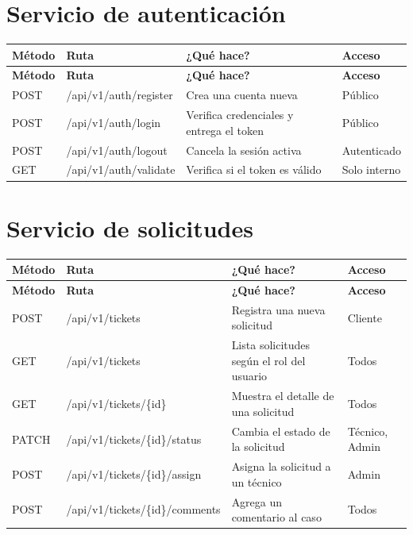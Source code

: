 \documentclass[12pt, a4paper]{report}
\begin{document}
\section{Servicio de autenticación}

\begin{longtable}{|p{1.8cm}|p{4.8cm}|p{4.2cm}|p{2.5cm}|}
\hline
\textbf{Método} & \textbf{Ruta} & \textbf{¿Qué hace?} &
\textbf{Acceso} \\
\hline
\endfirsthead
\hline
\textbf{Método} & \textbf{Ruta} & \textbf{¿Qué hace?} &
\textbf{Acceso} \\
\hline
\endhead
POST & /api/v1/auth/register &
Crea una cuenta nueva & Público \\
\hline
POST & /api/v1/auth/login &
Verifica credenciales y entrega el token & Público \\
\hline
POST & /api/v1/auth/logout &
Cancela la sesión activa & Autenticado \\
\hline
GET  & /api/v1/auth/validate &
Verifica si el token es válido & Solo interno \\
\hline
\end{longtable}

\section{Servicio de solicitudes}

\begin{longtable}{|p{1.8cm}|p{5.2cm}|p{3.8cm}|p{1.8cm}|}
\hline
\textbf{Método} & \textbf{Ruta} & \textbf{¿Qué hace?} &
\textbf{Acceso} \\
\hline
\endfirsthead
\hline
\textbf{Método} & \textbf{Ruta} & \textbf{¿Qué hace?} &
\textbf{Acceso} \\
\hline
\endhead
POST  & /api/v1/tickets &
Registra una nueva solicitud & Cliente \\
\hline
GET   & /api/v1/tickets &
Lista solicitudes según el rol del usuario & Todos \\
\hline
GET   & /api/v1/tickets/\{id\} &
Muestra el detalle de una solicitud & Todos \\
\hline
PATCH & /api/v1/tickets/\{id\}/status &
Cambia el estado de la solicitud & Técnico, Admin \\
\hline
POST  & /api/v1/tickets/\{id\}/assign &
Asigna la solicitud a un técnico & Admin \\
\hline
POST  & /api/v1/tickets/\{id\}/comments &
Agrega un comentario al caso & Todos \\
\hline
\end{longtable}
\end{document}
